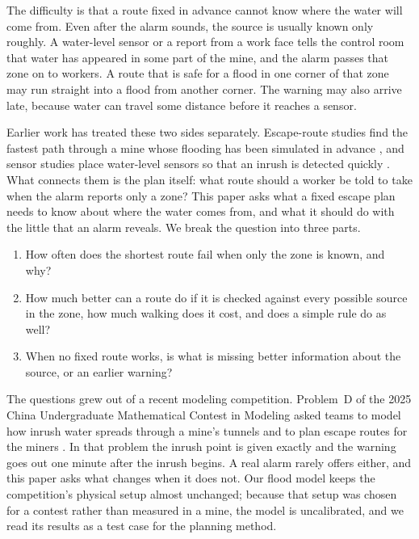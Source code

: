 \documentclass[11pt,a4paper]{article}
\begin{document}
The difficulty is that a route fixed in advance cannot know where the water will come from. Even after the alarm sounds, the source is usually known only roughly. A water-level sensor or a report from a work face tells the control room that water has appeared in some part of the mine, and the alarm passes that zone on to workers. A route that is safe for a flood in one corner of that zone may run straight into a flood from another corner. The warning may also arrive late, because water can travel some distance before it reaches a sensor.

Earlier work has treated these two sides separately. Escape-route studies find the fastest path through a mine whose flooding has been simulated in advance \cite{wu2020}, and sensor studies place water-level sensors so that an inrush is detected quickly \cite{wu2021}. What connects them is the plan itself: what route should a worker be told to take when the alarm reports only a zone? This paper asks what a fixed escape plan needs to know about where the water comes from, and what it should do with the little that an alarm reveals. We break the question into three parts.
\begin{enumerate}
\item How often does the shortest route fail when only the zone is known, and why?
\item How much better can a route do if it is checked against every possible source in the zone, how much walking does it cost, and does a simple rule do as well?
\item When no fixed route works, is what is missing better information about the source, or an earlier warning?
\end{enumerate}

The questions grew out of a recent modeling competition. Problem~D of the 2025 China Undergraduate Mathematical Contest in Modeling asked teams to model how inrush water spreads through a mine's tunnels and to plan escape routes for the miners \cite{cumcm}. In that problem the inrush point is given exactly and the warning goes out one minute after the inrush begins. A real alarm rarely offers either, and this paper asks what changes when it does not. Our flood model keeps the competition's physical setup almost unchanged; because that setup was chosen for a contest rather than measured in a mine, the model is uncalibrated, and we read its results as a test case for the planning method.
\end{document}
